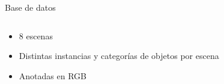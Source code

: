 \documentclass[]{beamer}
\begin{document}
\begin{frame}{Base de datos}
\begin{columns}[t]
\begin{column}{5cm}
            \begin{itemize}
                \item 8 escenas
                \item Distintas instancias y categorías de objetos por escena
                \item Anotadas en RGB
            \end{itemize}

        \end{column}
    \end{columns}

\end{frame}
\end{document}
